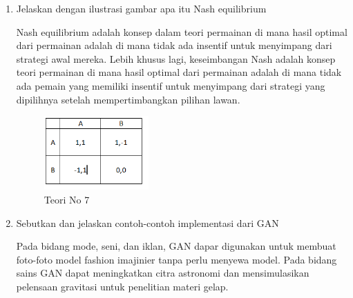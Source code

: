 \begin{enumerate}
            \item Jelaskan dengan ilustrasi gambar apa itu Nash equilibrium
            \par Nash equilibrium adalah konsep dalam teori permainan di mana hasil optimal dari permainan adalah di mana tidak ada insentif untuk menyimpang dari strategi awal mereka. Lebih khusus lagi, keseimbangan Nash adalah konsep teori permainan di mana hasil optimal dari permainan adalah di mana tidak ada pemain yang memiliki insentif untuk menyimpang dari strategi yang dipilihnya setelah mempertimbangkan pilihan lawan.
            \begin{figure}[H]
                \includegraphics[width=4cm]{figures/1174086/chapter8/teori7.png}
                \centering
                  \caption{Teori No 7}
            \end{figure}

            \item Sebutkan dan jelaskan contoh-contoh implementasi dari GAN
            \par Pada bidang mode, seni, dan iklan, GAN dapar digunakan untuk membuat foto-foto model fashion imajinier tanpa perlu menyewa model. Pada bidang sains GAN dapat meningkatkan citra astronomi dan mensimulasikan pelensaan gravitasi untuk penelitian materi gelap.


\end{enumerate}
